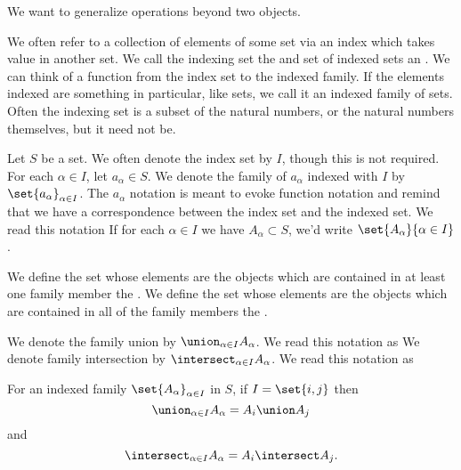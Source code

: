 
\sbasic





\sstart



We want to generalize operations beyond two objects.


We often refer to a collection of elements of some set
via an index which takes value in another set.
We call the indexing set the 
and set of indexed sets an .
We can think of a function from the index set to the indexed family.
If the elements indexed are something in particular, like sets, we call it an indexed family of sets.
Often the indexing set is a subset of the natural numbers, or the natural numbers themselves, but it need not be.

Let $S$ be a set.
We often denote the index set by $I$, though this is not required.
For each $\alpha \in I$, let $a_{\alpha} \in S$.
We denote the family of $a_{\alpha}$ indexed with $I$ by $\set{a_{\alpha}}_{\alpha \in I}$.
The $a_{\alpha}$ notation is meant to evoke function notation and remind that we have a correspondence between the index set and the indexed set.
We read this notation 
If for each $\alpha \in I$ we have $A_{\alpha} \subset S$, we'd write $\set{A_{\alpha}}{\alpha \in I}$.


We define the set whose elements are the objects
which are contained in at least one family member
the .
We define the set whose elements are the objects
which are contained in all of the family members
the .


We denote the family union by $\union_{\alpha \in I} A_{\alpha}$.
We read this notation as 
We denote family intersection by $\intersect_{\alpha \in I} A_{\alpha}$.
We read this notation as 


\begin{prop}
  For an indexed family $\set{A_{\alpha}}_{\alpha \in I}$ in $S$, if $I = \set{i, j}$ then
  \[
    \union_{\alpha \in I} A_{\alpha} = A_i \union A_j
  \]
  and
  \[
    \intersect_{\alpha \in I} A_{\alpha} = A_i \intersect A_j.
  \]
\end{prop}

